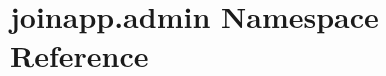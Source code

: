 \hypertarget{namespacejoinapp_1_1admin}{}\section{joinapp.\+admin Namespace Reference}
\label{namespacejoinapp_1_1admin}
